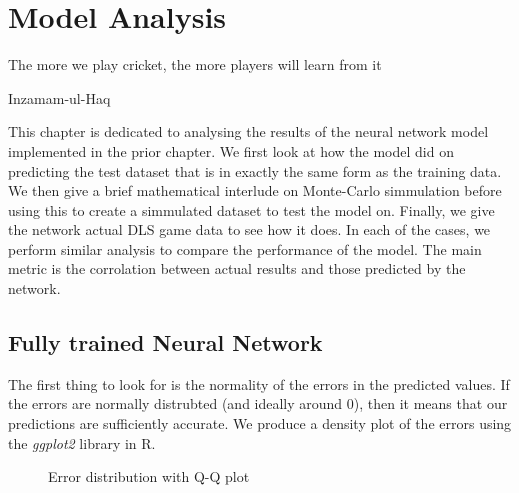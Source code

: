 \chapter{Model Analysis}

\epigraph{The more we play cricket, the more players will learn from it}{Inzamam-ul-Haq}

This chapter is dedicated to analysing the results of the neural network model implemented in the prior chapter. We first look at how the model did on predicting the test dataset 
that is in exactly the same form as the training data. We then give a brief mathematical interlude on Monte-Carlo simmulation before using this to create a simmulated dataset 
to test the model on. Finally, we give the network actual DLS game data to see how it does. In each of the cases, we perform similar analysis to compare the performance of the model.
The main metric is the corrolation between actual results and those predicted by the network.

\section{Fully trained Neural Network}
The first thing to look for is the normality of the errors in the predicted values. If the errors are normally distrubted (and ideally around 0),
then it means that our predictions are sufficiently accurate. We produce a density plot of the errors using the \textit{ggplot2} library in R.

\begin{figure}[h]
    \centering
    \qquad
    \caption{Error distribution with Q-Q plot}
    \label{errDistAndQQ}
\end{figure}

